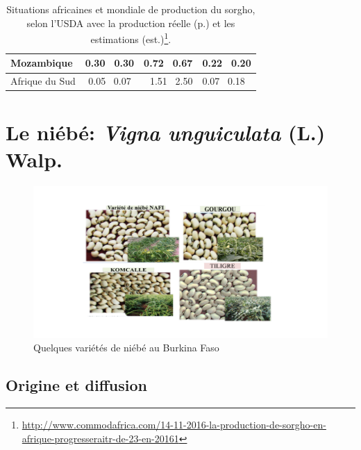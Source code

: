 \documentclass[a4paper,11pt]{article}
\begin{document}
\begin{table}
\begin{footnotesize}
\begin{center}
\begin{tabular}{|l|c|r|p{4cm}|}
        \multirow{1}{*}{Mozambique} & 0.30  \, 0.30 & 0.72  \, 0.67  & 0.22  \, 0.20  \\ \hline
        \multirow{1}{*}{Afrique du Sud} & 0.05  \, 0.07 & 1.51  \, 2.50  & 0.07  \, 0.18  \\ \hline
      \end{tabular}
      \caption{Situations africaines et mondiale de production du sorgho, selon l'USDA avec la production réelle (p.) et les estimations (est.)\protect\footnote{\protect\url{http://www.commodafrica.com/14-11-2016-la-production-de-sorgho-en-afrique-progresseraitr-de-23-en-20161}}.}
    \end{center}
  \end{footnotesize}
\end{table}



\section{Le niébé: \emph{Vigna unguiculata} (L.) Walp.}
\begin{figure}%
  \begin{center}
    \includegraphics[width=12cm]{images/graines_niebe}
  \end{center}
  \caption{Quelques variétés de niébé au Burkina Faso}
\end{figure}

\newpage



\subsection{Origine et diffusion}
\end{document}
